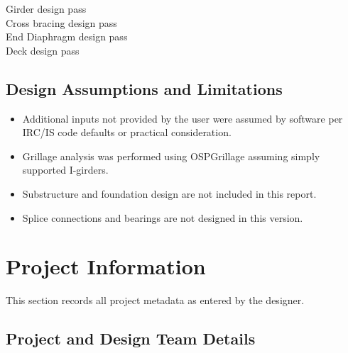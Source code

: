\documentclass[12pt,a4paper]{report}
\numberwithin{table}{chapter}
\numberwithin{figure}{chapter}
\begin{document}
\noindent Girder design pass \\
Cross bracing design pass \\
End Diaphragm design pass \\
Deck design pass

\section*{Design Assumptions and Limitations}
\label{sec:assumptions}

\begin{itemize}
\item Additional inputs not provided by the user were assumed by software per IRC/IS code defaults or practical consideration.
\item Grillage analysis was performed using OSPGrillage assuming simply supported I-girders.
\item Substructure and foundation design are not included in this report.
\item Splice connections and bearings are not designed in this version.
\end{itemize}

\titleformat{\chapter}[block]{\normalfont\Large\bfseries\centering}{\thechapter}{1em}{}
\titlespacing*{\chapter}{0pt}{-30pt}{10pt}


\chapter{Project Information}

This section records all project metadata as entered by the designer.

\section{Project and Design Team Details}
\label{sec:project-details}
\end{document}
